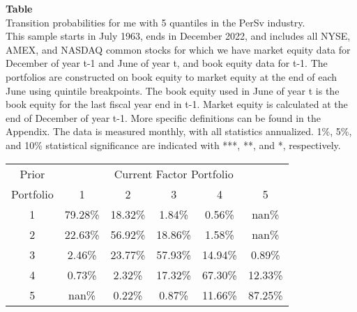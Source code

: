 \begin{table*}[ht!]
\raggedright
{}
\label{tab: transition_probs_me_PerSv_with_5_quantiles}
\textbf{Table \thetable} \\
Transition probabilities for me with 5 quantiles in the PerSv industry. \\
\hspace*{1em}This sample starts in July 1963, ends in December 2022, and includes all NYSE, AMEX, and NASDAQ common stocks for which we have market equity data for December of year t-1 and June of year t, and book equity data for t-1. The portfolios are constructed on book equity to market equity at the end of each June using quintile breakpoints.  The book equity used in June of year t is the book equity for the last fiscal year end in t-1.  Market equity is calculated at the end of December of year t-1.  More specific definitions can be found in the Appendix.  The data is measured monthly, with all statistics annualized.  1\%, 5\%, and 10\% statistical significance are indicated with ***, **, and *, respectively. \\
\vspace{0.5em}
\centering
\begin{adjustbox}{max width=\textwidth}
\begin{tabular}{@{}cccccc@{}}
\toprule
Prior & \multicolumn{5}{c}{Current Factor Portfolio} \\
Portfolio & 1 & 2 & 3 & 4 & 5 \\
\midrule
1 & 79.28\% & 18.32\% & 1.84\% & 0.56\% & nan\% \\
2 & 22.63\% & 56.92\% & 18.86\% & 1.58\% & nan\% \\
3 & 2.46\% & 23.77\% & 57.93\% & 14.94\% & 0.89\% \\
4 & 0.73\% & 2.32\% & 17.32\% & 67.30\% & 12.33\% \\
5 & nan\% & 0.22\% & 0.87\% & 11.66\% & 87.25\% \\
\bottomrule
\end{tabular}
\end{adjustbox}
\end{table*}